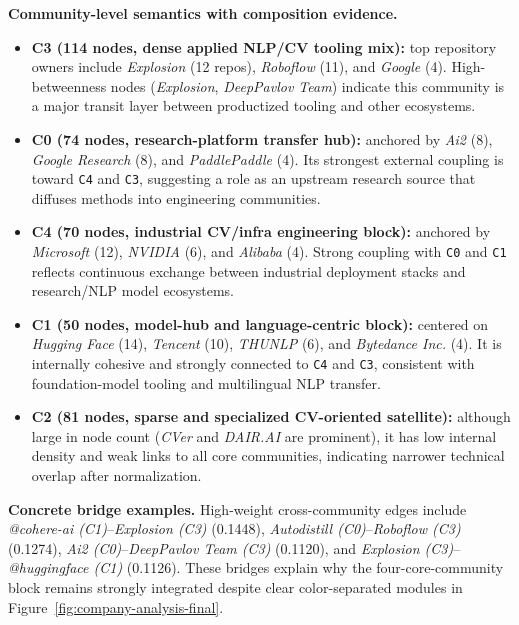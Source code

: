 \documentclass[11pt]{article}
\begin{document}
\textbf{Community-level semantics with composition evidence.}
\begin{itemize}[leftmargin=1.5em]
    \item \textbf{C3 (114 nodes, dense applied NLP/CV tooling mix):} top repository owners include \textit{Explosion} (12 repos), \textit{Roboflow} (11), and \textit{Google} (4). High-betweenness nodes (\textit{Explosion}, \textit{DeepPavlov Team}) indicate this community is a major transit layer between productized tooling and other ecosystems.
    \item \textbf{C0 (74 nodes, research-platform transfer hub):} anchored by \textit{Ai2} (8), \textit{Google Research} (8), and \textit{PaddlePaddle} (4). Its strongest external coupling is toward \texttt{C4} and \texttt{C3}, suggesting a role as an upstream research source that diffuses methods into engineering communities.
    \item \textbf{C4 (70 nodes, industrial CV/infra engineering block):} anchored by \textit{Microsoft} (12), \textit{NVIDIA} (6), and \textit{Alibaba} (4). Strong coupling with \texttt{C0} and \texttt{C1} reflects continuous exchange between industrial deployment stacks and research/NLP model ecosystems.
    \item \textbf{C1 (50 nodes, model-hub and language-centric block):} centered on \textit{Hugging Face} (14), \textit{Tencent} (10), \textit{THUNLP} (6), and \textit{Bytedance Inc.} (4). It is internally cohesive and strongly connected to \texttt{C4} and \texttt{C3}, consistent with foundation-model tooling and multilingual NLP transfer.
    \item \textbf{C2 (81 nodes, sparse and specialized CV-oriented satellite):} although large in node count (\textit{CVer} and \textit{DAIR.AI} are prominent), it has low internal density and weak links to all core communities, indicating narrower technical overlap after normalization.
\end{itemize}

\textbf{Concrete bridge examples.}
High-weight cross-community edges include
\textit{@cohere-ai (C1)}--\textit{Explosion (C3)} (0.1448),
\textit{Autodistill (C0)}--\textit{Roboflow (C3)} (0.1274),
\textit{Ai2 (C0)}--\textit{DeepPavlov Team (C3)} (0.1120), and
\textit{Explosion (C3)}--\textit{@huggingface (C1)} (0.1126).
These bridges explain why the four-core-community block remains strongly integrated despite clear color-separated modules in Figure~\ref{fig:company-analysis-final}.
\end{document}
